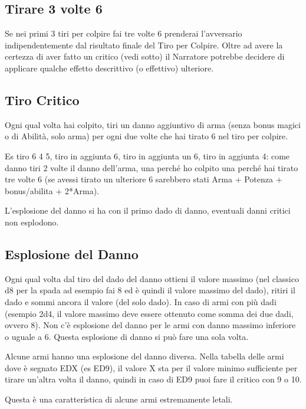 \documentclass[a4paper,11pt,twoside,openany]{book}
\begin{document}
\subsection{Tirare 3 volte 6}

Se nei primi 3 tiri per colpire fai tre volte 6 prenderai l'avversario indipendentemente dal risultato finale del Tiro per Colpire. Oltre ad avere la certezza di aver fatto un critico (vedi sotto) il Narratore potrebbe decidere di applicare qualche effetto descrittivo (o effettivo) ulteriore.

\subsection{Tiro Critico}

Ogni qual volta hai colpito, tiri un danno aggiuntivo di arma (senza bonus magici o di Abilità, solo arma) per ogni due volte che hai tirato 6 nel tiro per colpire.

Es tiro 6 4 5, tiro in aggiunta 6, tiro in aggiunta un 6, tiro in aggiunta 4: come danno tiri 2 volte il danno dell'arma, una perché ho colpito una perché hai tirato tre volte 6 (se avessi tirato un ulteriore 6 sarebbero stati Arma + Potenza + bonus/abilita + 2{*}Arma).

L'esplosione del danno si ha con il primo dado di danno, eventuali danni critici non esplodono.

\subsection{Esplosione del Danno}

Ogni qual volta dal tiro del dado del danno ottieni il valore massimo (nel classico d8 per la spada ad esempio fai 8 ed è quindi il valore massimo del dado), ritiri il dado e sommi ancora il valore (del solo dado). In caso di armi con più dadi (esempio 2d4, il valore massimo deve essere ottenuto come somma dei due dadi, ovvero 8). Non c'è esplosione del danno per le armi con danno massimo inferiore o uguale a 6. Questa esplosione di danno si può fare una sola volta.

Alcune armi hanno una esplosione del danno diversa. Nella tabella delle armi dove è segnato EDX (es ED9), il valore X sta per il valore minimo sufficiente per tirare un'altra volta il danno, quindi in caso di ED9 puoi fare il critico con 9 o 10.

Questa è una caratteristica di alcune armi estremamente letali.
\end{document}
